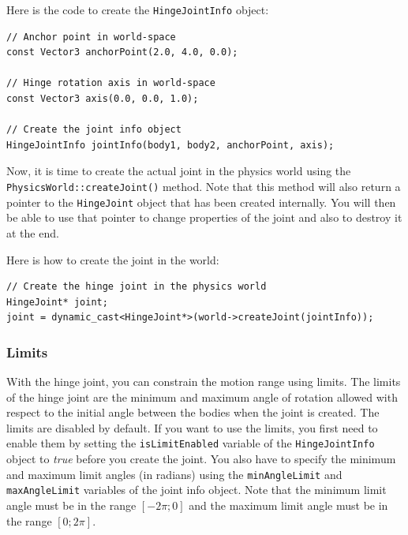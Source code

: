\documentclass[a4paper,12pt]{article}
\begin{document}
    Here is the code to create the \texttt{HingeJointInfo} object: \\

    \begin{lstlisting}
// Anchor point in world-space
const Vector3 anchorPoint(2.0, 4.0, 0.0);

// Hinge rotation axis in world-space
const Vector3 axis(0.0, 0.0, 1.0);

// Create the joint info object
HingeJointInfo jointInfo(body1, body2, anchorPoint, axis);
  \end{lstlisting}

    \vspace{0.6cm}

    \begin{sloppypar}
    Now, it is time to create the actual joint in the physics world using the \texttt{PhysicsWorld::createJoint()} method.
    Note that this method will also return a pointer to the \texttt{HingeJoint} object that has been created internally. You will then
    be able to use that pointer to change properties of the joint and also to destroy it at the end. \\
    \end{sloppypar}

    Here is how to create the joint in the world: \\

    \begin{lstlisting}
// Create the hinge joint in the physics world
HingeJoint* joint;
joint = dynamic_cast<HingeJoint*>(world->createJoint(jointInfo));
  \end{lstlisting}

     \subsubsection{Limits}

     With the hinge joint, you can constrain the motion range using limits. The limits of the hinge joint are the minimum and maximum angle of
     rotation allowed with respect to the initial angle between the bodies when the joint is created. The limits are disabled by default.
     If you want to use the limits, you first need to enable them by setting the \texttt{isLimitEnabled} variable of the \texttt{HingeJointInfo}
     object to \emph{true} before you create the joint. You also have to specify the minimum and maximum limit angles (in radians) using
     the \texttt{minAngleLimit} and \texttt{maxAngleLimit} variables of the joint info object. Note that the minimum limit angle must be in the
     range $[ -2 \pi; 0 ]$ and the maximum limit angle must be in the range $[ 0; 2 \pi ]$. \\
\end{document}
